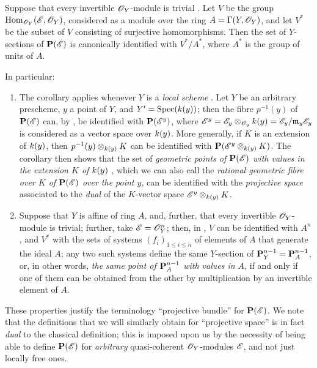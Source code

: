 \begin{corollary}[4.2.6]
\label{II.4.2.6}
Suppose that every invertible $\mathscr{O}_Y$-module is trivial .
Let $V$ be the group $\operatorname{Hom}_{\mathscr{O}_Y}(\mathscr{E},\mathscr{O}_Y)$, considered as a module over the ring $A=\Gamma(Y,\mathscr{O}_Y)$, and let $V^*$ be the subset of $V$ consisting of surjective homomorphisms.
Then the set of $Y$-sections of $\mathbf{P}(\mathscr{E})$ is canonically identified with $V^*/A^*$, where $A^*$ is the group of units of $A$.
\end{corollary}

In particular:
\begin{enumerate}
  \item The corollary  applies whenever $Y$ is a \emph{local scheme} .
    Let $Y$ be an arbitrary prescheme, $y$ a point of $Y$, and $Y'=\operatorname{Spec}(k(y))$;
    then the fibre $p^{-1}(y)$ of $\mathbf{P}(\mathscr{E})$ can, by , be identified with $\mathbf{P}(\mathscr{E}^y)$, where $\mathscr{E}^y = \mathscr{E}_y\otimes_{\mathscr{O}_y}k(y) = \mathscr{E}_y/\mathfrak{m}_y\mathscr{E}_y$ is considered as a vector space over $k(y)$.
    More generally, if $K$ is an extension of $k(y)$, then $p^{-1}(y)\otimes_{k(y)}K$ can be identified with $\mathbf{P}(\mathscr{E}^y\otimes_{k(y)}K)$.
    The corollary  then shows that the set of \emph{geometric points of $\mathbf{P}(\mathscr{E})$ with values in the extension $K$ of $k(y)$} , which we can also call the \emph{rational geometric fibre over $K$ of $\mathbf{P}(\mathscr{E})$ over the point $y$}, can be identified with the \emph{projective space} associated to the \emph{dual} of the $K$-vector space $\mathscr{E}^y\otimes_{k(y)}K$.
  \item Suppose that $Y$ is affine of ring $A$, and, further, that every invertible $\mathscr{O}_Y$-module is trivial;
    further, take $\mathscr{E}=\mathscr{O}_Y^n$;
    then, in , $V$ can be identified with $A^n$ , and $V^*$ with the sets of systems $(f_i)_{1\leq i\leq n}$ of elements of $A$ that generate the ideal $A$;
    any two such systems define the same $Y$-section of $\mathbf{P}_Y^{n-1}=\mathbf{P}_A^{n-1}$, or, in other words, \emph{the same point of $\mathbf{P}_A^{n-1}$ with values in $A$}, if and only if one of them can be obtained from the other by multiplication by an invertible element of $A$.
\end{enumerate}

These properties justify the terminology ``projective bundle'' for $\mathbf{P}(\mathscr{E})$.
We note that the definitions that we will similarly obtain for ``projective space'' is in fact \emph{dual} to the classical definition;
this is imposed upon us by the necessity of being able to define $\mathbf{P}(\mathscr{E})$ for \emph{arbitrary} quasi-coherent $\mathscr{O}_Y$-modules $\mathscr{E}$, and not just locally free ones.

